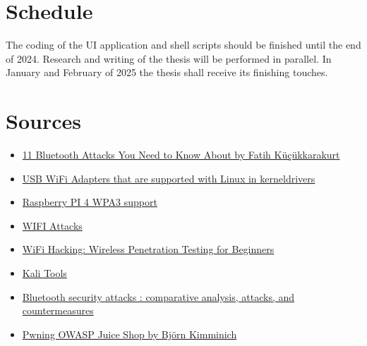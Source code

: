 \documentclass{article}
\begin{document}
\section{Schedule}

The coding of the UI application and shell scripts should be finished until the end of 2024. Research and writing of the thesis will be performed in parallel. 
In January and February of 2025 the thesis shall receive its finishing touches.


\section{Sources}

\begin{itemize}
    \item \href{https://www.makeuseof.com/bluetooth-attacks/}{11 Bluetooth Attacks You Need to Know About by Fatih Küçükkarakurt}
    \item \href{https://github.com/morrownr/USB-WiFi/blob/main/home/USB_WiFi_Adapters_that_are_supported_with_Linux_in-kernel_drivers.md}{USB WiFi Adapters that are supported with Linux in kerneldrivers}
    \item \href{https://forums.raspberrypi.com/viewtopic.php?t=364824#}{Raspberry PI 4 WPA3 support}
    \item \href{https://www.w3schools.com/cybersecurity/cybersecurity_wifi_attacks.php}{WIFI Attacks}
    \item \href{https://learning.oreilly.com/course/wifi-hacking-wireless/9781789530193/}{WiFi Hacking: Wireless Penetration Testing for Beginners}
    \item \href{https://www.kali.org/tools/}{Kali Tools}
    \item \href{https://link-springer-com.thn.idm.oclc.org/book/10.1007/978-3-642-40646-1}{Bluetooth security attacks : comparative analysis, attacks, and countermeasures}
    \item \href{https://help.owasp-juice.shop/}{Pwning OWASP Juice Shop by Björn Kimminich}
\end{itemize}
\end{document}
